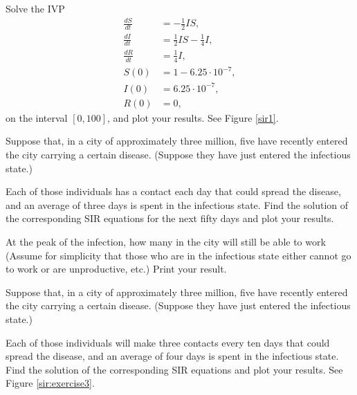 
% 
Solve the IVP
\begin{align*}
\frac{dS}{dt} &=-\frac{1}{2} IS ,\\
\frac{dI}{dt} &= \frac{1}{2} I S-\frac{1}{4} I, \\
\frac{dR}{dt} &=\frac{1}{4} I,\\
S(0) &= 1-6.25\cdot10^{-7},\\
I(0) &= 6.25\cdot10^{-7},\\
R(0) &=0,
\end{align*}
on the interval $[0,100]$, and plot your results.  See Figure \ref{sir1}. \label{prob_sir1}

Suppose that, in a city of approximately three million, five have recently entered the city carrying a certain disease.
(Suppose they have just entered the infectious state.)

Each of those individuals has a contact each day that could spread the disease, and an average of three days is spent in the infectious state.
Find the solution of the corresponding SIR equations for the next fifty days and plot your results.


At the peak of the infection, how many in the city will still be able to work (Assume for simplicity that those who are in the infectious state either cannot go to work or are unproductive, etc.)
Print your result.


Suppose that, in a city of approximately three million, five have recently entered the city carrying a certain disease.
(Suppose they have just entered the infectious state.)

Each of those individuals will make three contacts every ten days that could spread the disease, and an average of four days is spent in the infectious state.
Find the solution of the corresponding SIR equations and plot your results. See Figure \ref{sir:exercise3}.
\label{prob_sir3}

